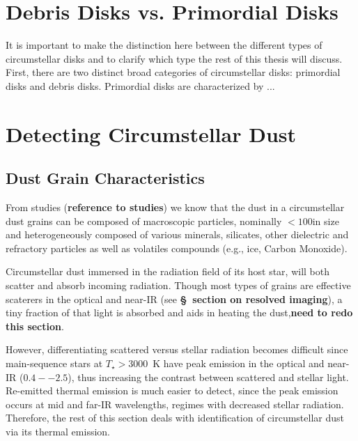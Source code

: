             
    \section{Debris Disks vs. Primordial Disks}\label{sec:dd_v_pd}
        
    It is important to make the distinction here between the different types of circumstellar disks and to clarify which type the rest of this thesis will discuss. First, there are two distinct broad categories of circumstellar disks: primordial disks and debris disks. Primordial disks are characterized by ...
    
    
    
    
  
    \section{Detecting Circumstellar Dust}\label{sec:excess_detection}

        \subsection{Dust Grain Characteristics}            
            
        From studies (\textbf{reference to studies}) we know that the dust in a circumstellar dust grains can be composed of macroscopic particles, nominally $<100$\micron in size and heterogeneously composed of various minerals, silicates, other dielectric and refractory particles as well as volatiles compounds (e.g., ice, Carbon Monoxide). 
                    
        Circumstellar dust immersed in the radiation field of its host star, will both scatter and absorb incoming radiation. Though most types of grains are effective scaterers in the optical and near-IR (see \textbf{\S~section on resolved imaging}), a tiny fraction of that light is absorbed and aids in heating the dust,\textbf{need to redo this section}.
        
        However, differentiating scattered versus stellar radiation becomes difficult since main-sequence stars at $T_\star>3000$~K have peak emission in the optical and near-IR ($0.4--2.5$\micron), thus increasing the contrast between scattered and stellar light. Re-emitted thermal emission is much easier to detect, since the peak emission occurs at mid and far-IR wavelengths, regimes with decreased stellar radiation. Therefore, the rest of this section deals with identification of circumstellar dust via its thermal emission.  
        
